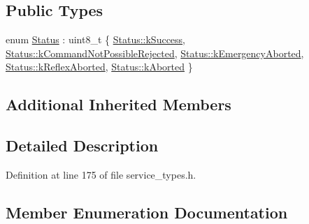 \subsection*{Public Types}
\begin{DoxyCompactItemize}
\item 
enum \hyperlink{structresearch__interface_1_1robot_1_1StopMove_a74b1999fa778670f312087dd9acf231d}{Status} \+: uint8\+\_\+t \{ \newline
\hyperlink{structresearch__interface_1_1robot_1_1StopMove_a74b1999fa778670f312087dd9acf231da8c632159fa131f09d04f94e3cbcd8782}{Status\+::k\+Success}, 
\hyperlink{structresearch__interface_1_1robot_1_1StopMove_a74b1999fa778670f312087dd9acf231da168d00b46403240019d0b42f5a116cdd}{Status\+::k\+Command\+Not\+Possible\+Rejected}, 
\hyperlink{structresearch__interface_1_1robot_1_1StopMove_a74b1999fa778670f312087dd9acf231da452811dc518f62ba40861befb68a20cf}{Status\+::k\+Emergency\+Aborted}, 
\hyperlink{structresearch__interface_1_1robot_1_1StopMove_a74b1999fa778670f312087dd9acf231daedb741f9f460686f7d799eb503d047f1}{Status\+::k\+Reflex\+Aborted}, 
\newline
\hyperlink{structresearch__interface_1_1robot_1_1StopMove_a74b1999fa778670f312087dd9acf231dac20d0424ae4484fda4424713f021d736}{Status\+::k\+Aborted}
 \}
\end{DoxyCompactItemize}
\subsection*{Additional Inherited Members}


\subsection{Detailed Description}


Definition at line 175 of file service\+\_\+types.\+h.



\subsection{Member Enumeration Documentation}
\mbox{\label{structresearch__interface_1_1robot_1_1StopMove_a74b1999fa778670f312087dd9acf231d}} 
